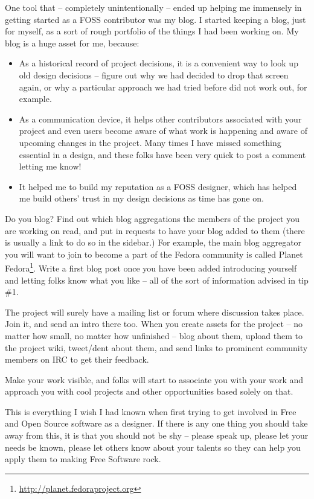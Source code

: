 One tool that -- completely unintentionally -- ended up helping me immensely in
getting started as a FOSS contributor was my blog. I started keeping a
blog, just for myself, as a sort of rough portfolio of the things I had been
working on. My blog is a huge asset for me, because:
\begin{itemize}
 \item As a historical record of project decisions, it is a convenient way to look up old design decisions -- figure out why we had decided to drop that screen again, or why a particular approach we had tried before did not work out, for example.
 \item As a communication device, it helps other contributors associated with your
project and even users become aware of what work is happening and aware of
upcoming changes in the project. Many times I have missed something essential in a design, and these folks have been very quick to post a comment letting me know!
 \item It helped me to build my reputation as a FOSS designer, which has helped me build others' trust in my design decisions as time has gone on. 
\end{itemize}

Do you blog? Find out which blog aggregations the members of the
project you are working on read, and put in requests to have your blog
added to them (there is usually a link to do so in the sidebar.) For example, the main blog aggregator you will want to join to become a part of the Fedora
community is called Planet Fedora\footnote{\url{http://planet.fedoraproject.org}}. Write a first blog
post once you have been added introducing yourself and letting folks know what you like -- all of the sort of information advised in tip \#1.

The project will surely have a mailing list or forum where discussion takes
place. Join it, and send an intro there too. When you create assets for the
project -- no matter how small, no matter how unfinished -- blog about them,
upload them to the project wiki, tweet/dent about them, and send links to
prominent community members on IRC to get their feedback.

Make your work visible, and folks will start to associate you with your work and
approach you with cool projects and other opportunities based solely on that.


This is everything I wish I had known when first trying to get involved in Free
and Open Source software as a designer. If there is any one thing you should
take away from this, it is that you should not be shy -- please speak up, please
let your needs be known, please let others know about your talents so they can
help you apply them to making Free Software rock.

